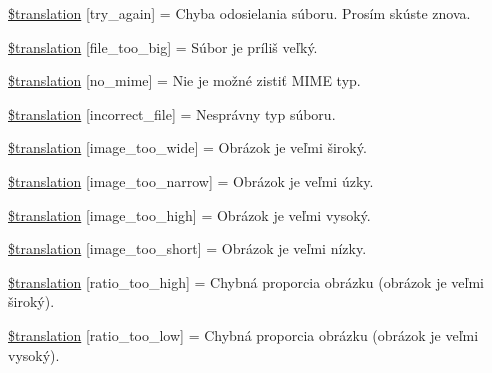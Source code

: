 \begin{DoxyCompactItemize}
\item 
\hyperlink{class_8upload_8sk___s_k_8php_a3afc377bd803683314f413a814243066}{\$translation} \mbox{[}\textquotesingle{}try\+\_\+again\textquotesingle{}\mbox{]} = \textquotesingle{}Chyba odosielania súboru. Prosím skúste znova.\textquotesingle{}
\item 
\hyperlink{class_8upload_8sk___s_k_8php_a476278eb4a0c3df56af068e2d511a741}{\$translation} \mbox{[}\textquotesingle{}file\+\_\+too\+\_\+big\textquotesingle{}\mbox{]} = \textquotesingle{}Súbor je príliš veľký.\textquotesingle{}
\item 
\hyperlink{class_8upload_8sk___s_k_8php_a191a55df8e3bb7f3c51b70f3c1932e02}{\$translation} \mbox{[}\textquotesingle{}no\+\_\+mime\textquotesingle{}\mbox{]} = \textquotesingle{}Nie je možné zistiť M\+I\+M\+E typ.\textquotesingle{}
\item 
\hyperlink{class_8upload_8sk___s_k_8php_a4d32343e2699edd6fd435f9c832cb9c7}{\$translation} \mbox{[}\textquotesingle{}incorrect\+\_\+file\textquotesingle{}\mbox{]} = \textquotesingle{}Nesprávny typ súboru.\textquotesingle{}
\item 
\hyperlink{class_8upload_8sk___s_k_8php_a0dd3e4930ca1f59ae280f4b1006525cd}{\$translation} \mbox{[}\textquotesingle{}image\+\_\+too\+\_\+wide\textquotesingle{}\mbox{]} = \textquotesingle{}Obrázok je veľmi široký.\textquotesingle{}
\item 
\hyperlink{class_8upload_8sk___s_k_8php_a5c9a4cd67fd21c32e0a3b434591a6037}{\$translation} \mbox{[}\textquotesingle{}image\+\_\+too\+\_\+narrow\textquotesingle{}\mbox{]} = \textquotesingle{}Obrázok je veľmi úzky.\textquotesingle{}
\item 
\hyperlink{class_8upload_8sk___s_k_8php_aa27bde361343f3b63c7cd441860024f8}{\$translation} \mbox{[}\textquotesingle{}image\+\_\+too\+\_\+high\textquotesingle{}\mbox{]} = \textquotesingle{}Obrázok je veľmi vysoký.\textquotesingle{}
\item 
\hyperlink{class_8upload_8sk___s_k_8php_a86fcd4e1157b00032df451188d735527}{\$translation} \mbox{[}\textquotesingle{}image\+\_\+too\+\_\+short\textquotesingle{}\mbox{]} = \textquotesingle{}Obrázok je veľmi nízky.\textquotesingle{}
\item 
\hyperlink{class_8upload_8sk___s_k_8php_a23396f6ce7f31e5e5f1b57580621d982}{\$translation} \mbox{[}\textquotesingle{}ratio\+\_\+too\+\_\+high\textquotesingle{}\mbox{]} = \textquotesingle{}Chybná proporcia obrázku (obrázok je veľmi široký).\textquotesingle{}
\item 
\hyperlink{class_8upload_8sk___s_k_8php_ac533b9a479f056b0b8623e4268f068c2}{\$translation} \mbox{[}\textquotesingle{}ratio\+\_\+too\+\_\+low\textquotesingle{}\mbox{]} = \textquotesingle{}Chybná proporcia obrázku (obrázok je veľmi vysoký).\textquotesingle{}

\end{DoxyCompactItemize}
